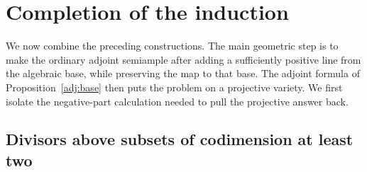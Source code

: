 \section{Completion of the induction}\label{sec:completion}

We now combine the preceding constructions. The main geometric step is
to make the ordinary adjoint semiample after adding a sufficiently
positive line from the algebraic base, while preserving the map to that
base. The adjoint formula of Proposition~\ref{adj:base} then puts the
problem on a projective variety. We first isolate the negative-part
calculation needed to pull the projective answer back.

\subsection{Divisors above subsets of codimension at least two}


